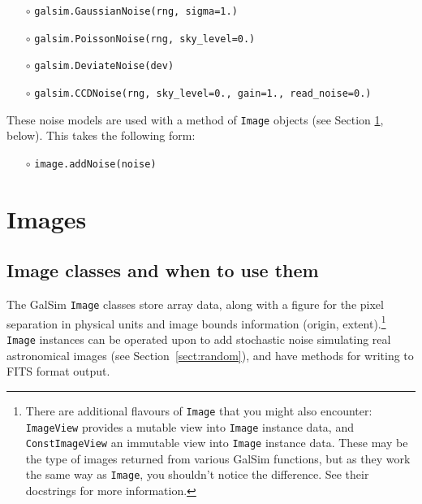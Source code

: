 \documentclass[preprint,11pt]{../../devel/modules/aastex}
\begin{document}
\begin{itemize}
\item[$\circ$] \texttt{galsim.GaussianNoise(rng, sigma=1.)} 

\item[$\circ$] \texttt{galsim.PoissonNoise(rng, sky\_level=0.)} 

\item[$\circ$] \texttt{galsim.DeviateNoise(dev)} 

\item[$\circ$] \texttt{galsim.CCDNoise(rng, sky\_level=0., gain=1., read\_noise=0.)}  

\end{itemize}

These noise models are used with a method of \texttt{Image} objects
(see Section \ref{sect:image}, below).  This takes the following form:

\begin{itemize}

\item[$\circ$] \texttt{image.addNoise(noise)} 

\end{itemize}

\section{Images}\label{sect:image}

\subsection{Image classes and when to use them}\label{sect:imageclasses}
The GalSim \texttt{Image} classes store array data, along with a
figure for the pixel separation in physical units and image bounds
information (origin, extent).\footnote{
There are additional flavours
of \texttt{Image} that you might also encounter: \texttt{ImageView}
provides a mutable view into \texttt{Image} instance data, and
\texttt{ConstImageView} an immutable view into \texttt{Image}
instance data.  These may be the type of images returned from
various GalSim functions, but as they work the same way as \texttt{Image},
you shouldn't notice the difference.  See their docstrings for more information.}
\texttt{Image} instances can be operated upon to add stochastic noise
simulating real astronomical images (see Section~\ref{sect:random}),
and have methods for writing to FITS format output.
\end{document}
